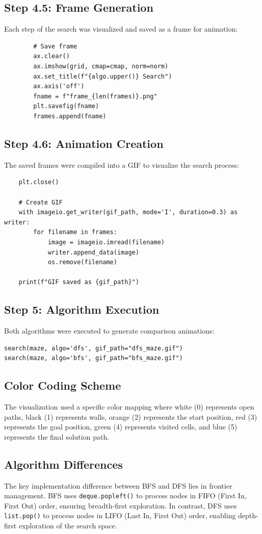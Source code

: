 \documentclass[a4paper, journal]{IEEEtran}
\begin{document}
\subsection*{Step 4.5: Frame Generation}
Each step of the search was visualized and saved as a frame for animation:
\begin{lstlisting}
        # Save frame
        ax.clear()
        ax.imshow(grid, cmap=cmap, norm=norm)
        ax.set_title(f"{algo.upper()} Search")
        ax.axis('off')
        fname = f"frame_{len(frames)}.png"
        plt.savefig(fname)
        frames.append(fname)
\end{lstlisting}

\subsection*{Step 4.6: Animation Creation}
The saved frames were compiled into a GIF to visualize the search process:
\begin{lstlisting}
    plt.close()

    # Create GIF
    with imageio.get_writer(gif_path, mode='I', duration=0.3) as writer:
        for filename in frames:
            image = imageio.imread(filename)
            writer.append_data(image)
            os.remove(filename)

    print(f"GIF saved as {gif_path}")
\end{lstlisting}

\subsection{Step 5: Algorithm Execution}
Both algorithms were executed to generate comparison animations:
\begin{lstlisting}
search(maze, algo='dfs', gif_path="dfs_maze.gif")
search(maze, algo='bfs', gif_path="bfs_maze.gif")
\end{lstlisting}

\subsection{Color Coding Scheme}
The visualization used a specific color mapping where white (0) represents open paths, black (1) represents walls, orange (2) represents the start position, red (3) represents the goal position, green (4) represents visited cells, and blue (5) represents the final solution path.

\subsection{Algorithm Differences}
The key implementation difference between BFS and DFS lies in frontier management. BFS uses \texttt{deque.popleft()} to process nodes in FIFO (First In, First Out) order, ensuring breadth-first exploration. In contrast, DFS uses \texttt{list.pop()} to process nodes in LIFO (Last In, First Out) order, enabling depth-first exploration of the search space.
\end{document}
